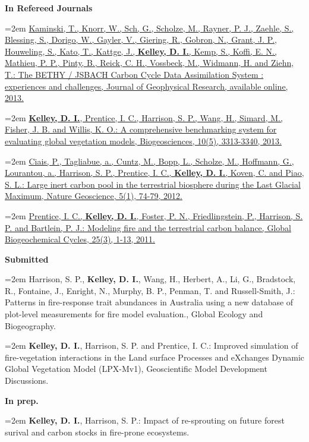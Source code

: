 \documentclass[paper=a4,fontsize=11pt]{scrartcl}	 			%
\newcommand{\sepspace}{\vspace*{1em}}			%
\newcommand{\BibEntry}[2]{
		\noindent \textbf{#1} \hfill \par					%
		\noindent\hangindent=2em\hangafter=0 \small #2 	%
		\normalsize \par}
\begin{document}
\BibEntry{In Refereed Journals}{\href{http://onlinelibrary.wiley.com/doi/10.1002/jgrg.20118/abstract}{Kaminski, T., Knorr, W., Sch, G., Scholze, M., Rayner, P. J., Zaehle, S., Blessing, S., Dorigo, W., Gayler, V., Giering, R., Gobron, N., Grant, J. P., Houweling, S., Kato, T., Kattge, J., \textbf{Kelley, D. I.}, Kemp, S., Koffi, E. N., Mathieu, P. P., Pinty, B., Reick, C. H., Vossbeck, M., Widmann, H. and Ziehn, T.: The BETHY / JSBACH Carbon Cycle Data Assimilation System : experiences and challenges, Journal of Geophysical Research, available online, 2013.}}


\BibEntry{} {\href{http://www.biogeosciences.net/10/3313/2013/bg-10-3313-2013.html}{\textbf{Kelley, D. I.}, Prentice, I. C., Harrison, S. P., Wang, H., Simard, M., Fisher, J. B. and Willis, K. O.: A comprehensive benchmarking system for evaluating global vegetation models, Biogeosciences, 10(5), 3313-3340, 2013.}}


\BibEntry{} {\href{http://www.nature.com/ngeo/journal/v5/n1/full/ngeo1324.html}{Ciais, P., Tagliabue, a., Cuntz, M., Bopp, L., Scholze, M., Hoffmann, G., Lourantou, a., Harrison, S. P., Prentice, I. C., \textbf{Kelley, D. I.}, Koven, C. and Piao, S. L.: Large inert carbon pool in the terrestrial biosphere during the Last Glacial Maximum, Nature Geoscience, 5(1), 74-79, 2012.}}


\BibEntry{} {\href{http://onlinelibrary.wiley.com/doi/10.1029/2010GB003906/abstract}{Prentice, I. C., \textbf{Kelley, D. I.}, Foster, P. N., Friedlingstein, P., Harrison, S. P. and Bartlein, P. J.: Modeling fire and the terrestrial carbon balance, Global Biogeochemical Cycles, 25(3), 1-13, 2011.}}
\sepspace
\pagebreak

\BibEntry{Submitted} {Harrison, S. P., \textbf{Kelley, D. I.}, Wang, H., Herbert, A., Li, G., Bradstock, R., Fontaine, J., Enright, N., Murphy, B. P., Penman, T. and Russell-Smith, J.: Patterns in fire-response trait abundances in Australia using a new database of plot-level measurements for fire model evaluation., Global Ecology and Biogeography.}

\BibEntry{} {\textbf{Kelley, D. I.}, Harrison, S. P. and Prentice, I. C.: Improved simulation of fire-vegetation interactions in the Land surface Processes and eXchanges Dynamic Global Vegetation Model (LPX-Mv1), Geoscientific Model Development Discussions.}
\sepspace

\BibEntry{In prep.} {\textbf{Kelley, D. I.}, Harrison, S. P.: Impact of re-sprouting on future forest surival and carbon stocks in fire-prone ecosystems.}
\end{document}
